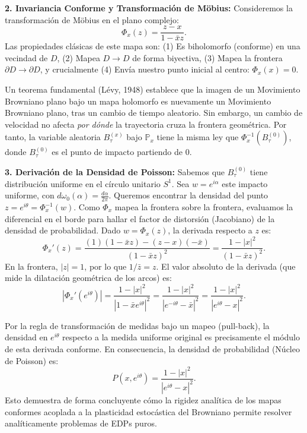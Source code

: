 \documentclass[11pt, letterpaper]{article}
\begin{document}
\begin{solucion}
    \textbf{2. Invariancia Conforme y Transformación de Möbius:}
    Consideremos la transformación de Möbius en el plano complejo:
    \[ \Phi_x(z) = \frac{z - x}{1 - \bar{x}z}. \]
    Las propiedades clásicas de este mapa son: (1) Es biholomorfo (conforme) en una vecindad de $D$, (2) Mapea $D \to D$ de forma biyectiva, (3) Mapea la frontera $\partial D \to \partial D$, y crucialmente (4) Envía nuestro punto inicial al centro: $\Phi_x(x) = 0$.

    Un teorema fundamental (Lévy, 1948) establece que la imagen de un Movimiento Browniano plano bajo un mapa holomorfo es nuevamente un Movimiento Browniano plano, tras un cambio de tiempo aleatorio.
    Sin embargo, un cambio de velocidad no afecta \textit{por dónde} la trayectoria cruza la frontera geométrica. Por tanto, la variable aleatoria $B_\tau^{(x)}$ bajo $\mathbb{P}_x$ tiene la misma ley que $\Phi_x^{-1}(B_\tau^{(0)})$, donde $B_\tau^{(0)}$ es el punto de impacto partiendo de $0$.

    \textbf{3. Derivación de la Densidad de Poisson:}
    Sabemos que $B_\tau^{(0)}$ tiene distribución uniforme en el círculo unitario $S^1$. Sea $w = e^{i\alpha}$ este impacto uniforme, con $d\omega_0(\alpha) = \frac{d\alpha}{2\pi}$.
    Queremos encontrar la densidad del punto $z = e^{i\theta} = \Phi_x^{-1}(w)$.
    Como $\Phi_x$ mapea la frontera sobre la frontera, evaluamos la diferencial en el borde para hallar el factor de distorsión (Jacobiano) de la densidad de probabilidad.
    Dado $w = \Phi_x(z)$, la derivada respecto a $z$ es:
    \[ \Phi_x'(z) = \frac{(1)(1 - \bar{x}z) - (z - x)(-\bar{x})}{(1 - \bar{x}z)^2} = \frac{1 - |x|^2}{(1 - \bar{x}z)^2}. \]
    En la frontera, $|z|=1$, por lo que $1/\bar{z} = z$.
    El valor absoluto de la derivada (que mide la dilatación geométrica de los arcos) es:
    \[ |\Phi_x'(e^{i\theta})| = \frac{1 - |x|^2}{|1 - \bar{x}e^{i\theta}|^2} = \frac{1 - |x|^2}{|e^{-i\theta} - \bar{x}|^2} = \frac{1 - |x|^2}{|e^{i\theta} - x|^2}. \]
    
    Por la regla de transformación de medidas bajo un mapeo (pull-back), la densidad en $e^{i\theta}$ respecto a la medida uniforme original es precisamente el módulo de esta derivada conforme.
    En consecuencia, la densidad de probabilidad (Núcleo de Poisson) es:
    \[ P(x, e^{i\theta}) = \frac{1 - |x|^2}{|e^{i\theta} - x|^2}. \]
    Esto demuestra de forma concluyente cómo la rigidez analítica de los mapas conformes acoplada a la plasticidad estocástica del Browniano permite resolver analíticamente problemas de EDPs puros.
\end{solucion}
\end{document}
